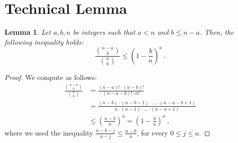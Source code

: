 \documentclass[11pt,a4paper]{article}
\newtheorem{lemma}{Lemma}
\begin{document}
\section{Technical Lemma}
\begin{lemma}\label{lem:tech}
    Let $a,b,n$ be integers such that $a < n$ and $b \le n - a$. Then, the following inequality holds:
    $$\frac{ {n - a \choose b}}{{n \choose b}} \le \left(1 - \frac{b}{n} \right)^a \ .$$
\end{lemma}
\begin{proof}
We compute as follows:
    \begin{align*}
       \frac{ {n - a \choose b}}{{n \choose b}} & = \frac{(n-a)! \cdot (n-b)!}{(n-a-b)! \cdot n!} \\
       & = \frac{(n-b) \cdot (n-b-1) \cdot \ldots \cdot (n-a-b+1)}{n \cdot (n-1) \cdot \ldots \cdot (n-a+1)} \\
       & \le \left( \frac{n-b}{n} \right)^{a} = \left( 1 - \frac{b}{n} \right)^a \ ,
    \end{align*}
    where we used the inequality $\frac{n-b-j}{n-j} \le \frac{n-b}{n}$, for every $0 \le j \le a$.
\end{proof}
\end{document}
